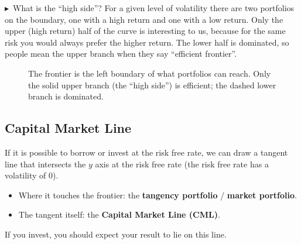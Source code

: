 \documentclass[11pt]{article}
\newcommand{\term}[1]{\textbf{\textcolor{cTerm}{#1}}}
\newcommand{\fillnote}[1]{\begin{noteboxenv}\small\textcolor{cNote}{$\blacktriangleright$}\ #1\end{noteboxenv}}
\begin{document}
\fillnote{What is the ``high side''? For a given level of volatility there are two
portfolios on the boundary, one with a high return and one with a low return.
Only the upper (high return) half of the curve is interesting to us, because for
the same risk you would always prefer the higher return. The lower half is
dominated, so people mean the upper branch when they say ``efficient frontier''.}

\begin{figure}[h]
\centering
{}
\caption*{The frontier is the left boundary of what portfolios can reach. Only the solid upper branch (the ``high side'') is efficient; the dashed lower branch is dominated.}
\end{figure}

\subsection*{Capital Market Line}
If it is possible to borrow or invest at the risk free rate, we can draw a
tangent line that intersects the $y$ axis at the risk free rate (the risk free
rate has a volatility of 0).
\begin{itemize}[nosep]
  \item Where it touches the frontier: the \term{tangency portfolio} /
        \term{market portfolio}.
  \item The tangent itself: the \term{Capital Market Line (CML)}.
\end{itemize}
If you invest, you should expect your result to lie on this line.
\end{document}
